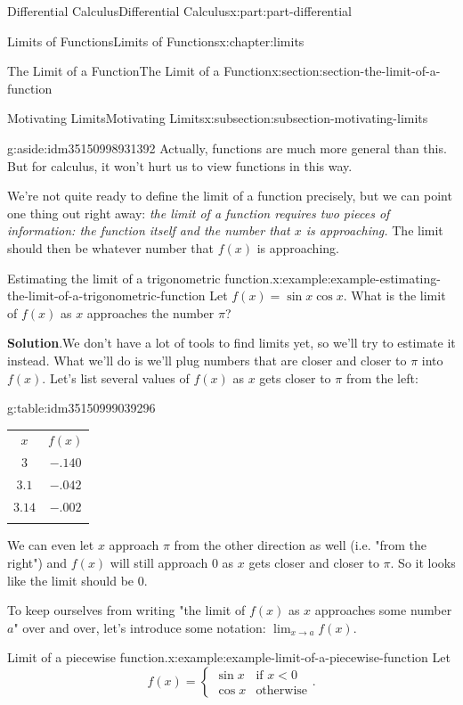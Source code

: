 \documentclass[twoside,10pt,]{book}
\newcommand{\blocktitlefont}{\relax}
\newcommand{\tabularfont}{\relax}
\numberwithin{equation}{part}
\newcommand{\hrulethin}  {\noalign{\hrule height 0.04em}}
\newcommand{\hrulethick} {\noalign{\hrule height 0.11em}}
\begin{document}
\begin{partptx}{Differential Calculus}{}{Differential Calculus}{}{}{x:part:part-differential}
\begin{chapterptx}{Limits of Functions}{}{Limits of Functions}{}{}{x:chapter:limits}
\begin{sectionptx}{The Limit of a Function}{}{The Limit of a Function}{}{}{x:section:section-the-limit-of-a-function}
\begin{subsectionptx}{Motivating Limits}{}{Motivating Limits}{}{}{x:subsection:subsection-motivating-limits}
\begin{aside}{}{g:aside:idm35150998931392}%
Actually, functions are much more general than this. But for calculus, it won't hurt us to view functions in this way.%
\end{aside}
We're not quite ready to define the limit of a function precisely, but we can point one thing out right away: \emph{the limit of a function requires two pieces of information: the function itself and the number that \(x\) is approaching.} The limit should then be whatever number that \(f(x)\) is approaching.%
\begin{example}{Estimating the limit of a trigonometric function.}{x:example:example-estimating-the-limit-of-a-trigonometric-function}%
Let \(f(x) = \sin x\cos x\). What is the limit of \(f(x)\) as \(x\) approaches the number \(\pi\)?%
\par\smallskip%
\noindent\textbf{\blocktitlefont Solution}.\hypertarget{g:solution:idm35150999041600}{}\quad{}We don't have a lot of tools to find limits yet, so we'll try to estimate it instead. What we'll do is we'll plug numbers that are closer and closer to \(\pi\) into \(f(x)\). Let's list several values of \(f(x)\) as \(x\) gets closer to \(\pi\) from the left:%
\begin{tableptx}{\textbf{}}{g:table:idm35150999039296}{}%
\centering%
{\tabularfont%
\begin{tabular}{cc}\hrulethick
\(x\)&\(f(x)\)\tabularnewline\hrulethin
\(3\)&\(-.140\)\tabularnewline[0pt]
\(3.1\)&\(-.042\)\tabularnewline[0pt]
\(3.14\)&\(-.002\)\tabularnewline\hrulethick
\end{tabular}
}%
\end{tableptx}%
We can even let \(x\) approach \(\pi\) from the other direction as well (i.e. "from the right") and \(f(x)\) will still approach \(0\) as \(x\) gets closer and closer to \(\pi\). So it looks like the limit should be \(0\).%
\end{example}
To keep ourselves from writing "the limit of \(f(x)\) as \(x\) approaches some number \(a\)" over and over, let's introduce some notation: \(\lim_{x\to a}f(x)\).%
\begin{example}{Limit of a piecewise function.}{x:example:example-limit-of-a-piecewise-function}%
Let%
%
\begin{equation*}
f(x) = \begin{cases} \sin x & \text{if $x<0$} \\ \cos x & \text{otherwise} \end{cases}.
\end{equation*}

\end{example}
\end{subsectionptx}
\end{sectionptx}
\end{chapterptx}
\end{partptx}
\end{document}

